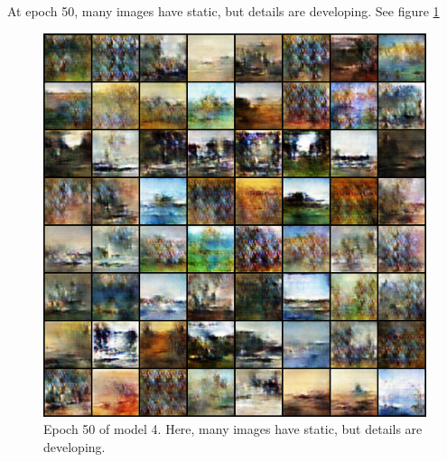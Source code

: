 \documentclass[11pt,letterpaper]{article}
\begin{document}
				At epoch 50, many images have static, but details are developing.
				See figure \ref{fig:wa64:epoch050generator}
				\begin{figure}
					\centering
					\includegraphics[width=1.0\linewidth]{results/model4/epoch050_generator}
					\caption{Epoch 50 of model 4. Here, many images have static, but details are developing.}
					\label{fig:wa64:epoch050generator}
				\end{figure}
\end{document}
